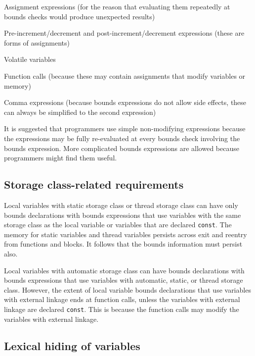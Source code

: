 \begin{compactitem}
\item
  Assignment expressions (for the reason that evaluating them repeatedly
  at bounds checks would produce unexpected results)
\item
  Pre-increment/decrement and post-increment/decrement expressions
  (these are forms of assignments)
\item
  Volatile variables
\item
  Function calls (because these may contain assignments that modify
  variables or memory)
\item
  Comma expressions (because bounds expressions do not allow side
  effects, these can always be simplified to the second expression)
\end{compactitem}

It is suggested that programmers use simple non-modifying expressions because
the expressions may be fully re-evaluated at every bounds check involving the
bounds expression. More complicated bounds expressions are allowed
because programmers might find them useful.

\subsection{Storage class-related requirements}

Local variables with static storage class or thread storage class can
have only bounds declarations with bounds expressions that use variables
with the same storage class as the local variable or variables that are declared
\texttt{const}. The memory for static variables and thread variables
persists across exit and reentry from functions and blocks. It follows
that the bounds information must persist also.

Local variables with automatic storage class can have bounds
declarations with bounds expressions that use variables with automatic,
static, or thread storage class. However, the extent of local variable
bounds declarations that use variables with external linkage ends at
function calls, unless the variables with external linkage are declared
\texttt{const}. This is because the function calls may modify the
variables with external linkage.

\subsection{Lexical hiding of variables}

